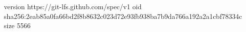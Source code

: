 version https://git-lfs.github.com/spec/v1
oid sha256:2eab85a0fa66bd2f8b8632c023d72e93fb938ba7b9da766a192a2a1cbf78334c
size 5566
